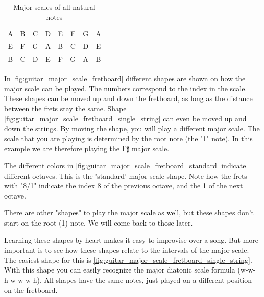 \begin{table}[h]
\begin{tabular}{*{16}{c}}
		\multicolumn{2}{P{4mm}}{A} & \multicolumn{2}{P{4mm}}{B} & \multicolumn{2}{P{4mm}}{C\sharp} & \multicolumn{2}{P{4mm}}{D} & \multicolumn{2}{P{4mm}}{E} & \multicolumn{2}{P{4mm}}{F\sharp} & \multicolumn{2}{P{4mm}}{G\sharp} & \multicolumn{2}{P{4mm}}{A} \\
		\multicolumn{2}{P{4mm}}{E} & \multicolumn{2}{P{4mm}}{F\sharp} & \multicolumn{2}{P{4mm}}{G\sharp} & \multicolumn{2}{P{4mm}}{A} & \multicolumn{2}{P{4mm}}{B} & \multicolumn{2}{P{4mm}}{C\sharp} & \multicolumn{2}{P{4mm}}{D\sharp} & \multicolumn{2}{P{4mm}}{E} \\
		\multicolumn{2}{P{4mm}}{B} & \multicolumn{2}{P{4mm}}{C\sharp} & \multicolumn{2}{P{4mm}}{D\sharp} & \multicolumn{2}{P{4mm}}{E} & \multicolumn{2}{P{4mm}}{F\sharp} & \multicolumn{2}{P{4mm}}{G\sharp} & \multicolumn{2}{P{4mm}}{A\sharp} & \multicolumn{2}{P{4mm}}{B}
	\end{tabular}
	\caption{Major scales of all natural notes}
	\label{tab:guitar_natural_note_major_scale}
\end{table}

\newpage

In \autoref{fig:guitar_major_scale_fretboard} different shapes are shown on how the major scale can be played. The numbers correspond to the index in the scale. These shapes can be moved up and down the fretboard, as long as the distance between the frets stay the same. Shape \autoref{fig:guitar_major_scale_fretboard_single_string} can even be moved up and down the strings. By moving the shape, you will play a different major scale. The scale that you are playing is determined by the root note (the "1" note). In this example we are therefore playing the F$\sharp$ major scale.

The different colors in \autoref{fig:guitar_major_scale_fretboard_standard} indicate different octaves. This is the 'standard' major scale shape. Note how the frets with "8/1" indicate the index 8 of the previous octave, and the 1 of the next octave.

There are other "shapes" to play the major scale as well, but these shapes don't start on the root (1) note. We will come back to those later.

Learning these shapes by heart makes it easy to improvise over a song. But more important is to see how these shapes relate to the intervals of the major scale. The easiest shape for this is \autoref{fig:guitar_major_scale_fretboard_single_string}. With this shape you can easily recognize the major diatonic scale formula (w-w-h-w-w-w-h). All shapes have the same notes, just played on a different position on the fretboard.

